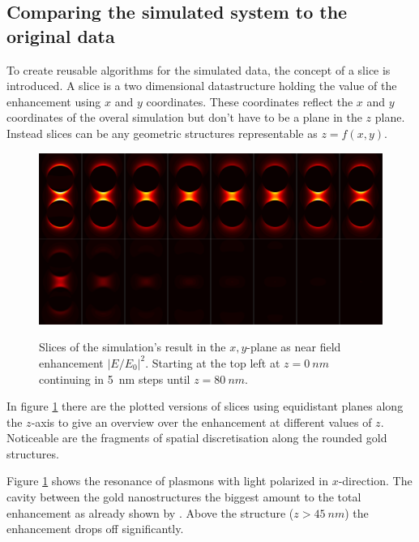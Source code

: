 \subsection{Comparing the simulated system to the original data}

To create reusable algorithms for the simulated data, the concept of a slice is introduced. A slice is a two dimensional datastructure holding the value of the enhancement using $x$ and $y$ coordinates. These coordinates reflect the $x$ and $y$ coordinates of the overal simulation but don't have to be a plane in the $z$ plane. Instead slices can be any geometric structures representable as $z=f(x,y)$.

\begin{figure}[!h]
  \includegraphics[width=\textwidth]{./images/simulation-slices.png}
  \label{slices}
  \caption{Slices of the simulation's result in the $x,y$-plane as near field enhancement $|E/E_0|^2$. Starting at the top left at $z=\SI{0}{nm}$ continuing in \SI{5}{nm} steps until $z=\SI{80}{nm}$.}
\end{figure}

In figure \ref{slices} there are the plotted versions of slices using equidistant planes along the $z$-axis to give an overview over the enhancement at different values of $z$. Noticeable are the fragments of spatial discretisation along the rounded gold structures.

Figure \ref{slices} shows the resonance of plasmons with light polarized in $x$-direction. The cavity between the gold nanostructures the biggest amount to the total enhancement as already shown by \cite{heeg}. Above the structure ($z>\SI{45}{nm}$) the enhancement drops off significantly.
